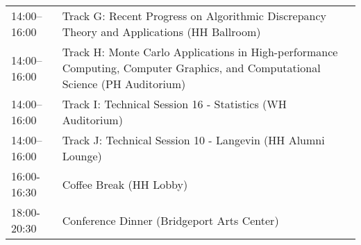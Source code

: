 \begin{table}
{\begin{tabularx}{\textwidth}{>{\hsize=0.32\hsize}X|>{\hsize=1.7\hsize}X}
\cellcolor{\SessionTitleColor}14:00–16:00 & \cellcolor{\SessionTitleColor}Track G: Recent Progress on Algorithmic Discrepancy Theory and Applications (HH Ballroom) \\
\cellcolor{\SessionTitleColor}14:00–16:00 & \cellcolor{\SessionTitleColor}Track H: Monte Carlo Applications in High-performance Computing, Computer Graphics, and Computational Science (PH Auditorium) \\
\cellcolor{\SessionLightColor}14:00–16:00 & \cellcolor{\SessionLightColor}Track I: Technical Session 16 - Statistics (WH Auditorium) \\
\cellcolor{\SessionLightColor}14:00–16:00 & \cellcolor{\SessionLightColor}Track J: Technical Session 10 - Langevin (HH Alumni Lounge) \\
\cellcolor{\EmptyColor}16:00-16:30 & \cellcolor{\EmptyColor}Coffee Break (HH Lobby) \\
\cellcolor{\EmptyColor}18:00-20:30 & \cellcolor{\EmptyColor}Conference Dinner (Bridgeport Arts Center) \\
\hline
\end{tabularx}
}
\end{table}

